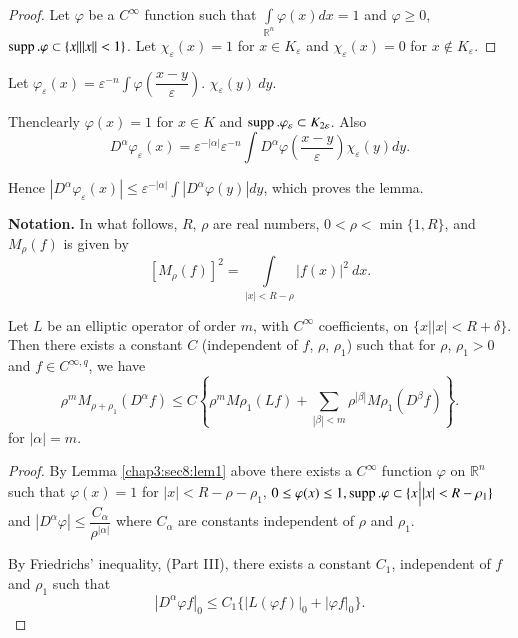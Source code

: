 \begin{proof}
  Let $\varphi$ be a $C^\infty$ function such that
  $\int\limits_{\mathbb{R}^n} \varphi (x) dx = 1$ and $\varphi \geq
  0$, $\operatorname{supp}. \varphi \subset \{x | || x || < 1 \}$. Let $\chi_
  \varepsilon (x) = 1$ for $x \in K_\varepsilon$ and $\chi_
  \varepsilon (x) = 0$ for $x \notin K_\varepsilon$. 
\end{proof}

Let $\varphi_ \varepsilon (x) = \varepsilon^{-n} \int \varphi
\left(\dfrac{x-y}{\varepsilon}\right)$. $\chi_ \varepsilon (y) ~ dy$. 

Then\pageoriginale clearly $\varphi (x)  = 1$ for $x \in K$ and $\operatorname{supp}. \varphi_
\varepsilon \subset K_{2 \varepsilon}$. Also 
$$
D^ \alpha \varphi_ \varepsilon (x) = \varepsilon^{- | \alpha|}
\varepsilon^{-n} \int D^ \alpha \varphi \left(\frac{x-y} {\varepsilon}\right)
\chi_ \varepsilon (y) dy. 
$$

Hence $| D^ \alpha \varphi_\varepsilon (x) | \leq \varepsilon^{-|
  \alpha |} \int | D^ \alpha \varphi (y) | dy$, which proves the
lemma. 

\noindent
\textbf{Notation.} In what follows, $R$, $\rho$ are real numbers, $0 <
\rho < \min \{1, R\}$, and $M_ \rho (f)$ is given by  
$$
[M_ \rho (f)]^2 = \int\limits_{|x| < R - \rho} | f(x) |^2  ~ dx.
$$

\setcounter{proposition}{0}
\begin{proposition}\label{chap3:sec8:prop1}%
  Let $L$ be an elliptic operator of order $m$, with $C^ \infty$
  coefficients, on $\{x \Big| |x| < R + \delta \}$. Then there exists a
  constant $C$ (independent of $f$, $\rho$, $\rho_1$) such that for
  $\rho$, $\rho_1 > 0$ and $f \in C^{\infty, q}$, we have 
  $$
  \rho^m M_{\rho + \rho_1} (D^\alpha f) \leq C \left\{ \rho^m M \rho_1
  (Lf) + \sum_{|\beta| < m} \rho^{|\beta|} M \rho_1 (D^{\beta}
  f)\right \}. 
  $$
  for $|\alpha| = m$.
\end{proposition}

\begin{proof}
  By Lemma \ref{chap3:sec8:lem1} above there exists a $C^ \infty$ function $\varphi$ on
  $\mathbb{R}^n$ such that $\varphi(x)  = 1$ for $| x | < R - \rho -
  \rho_1$, $0 \leq \varphi (x) \leq 1, \operatorname{supp}. \varphi \subset \{ x
  \Big| |x| < R - \rho_1 \}$ and $| D^ \alpha \varphi| \leq
  \dfrac{C_\alpha}{\rho^{|\alpha|}}$ where $C_\alpha$ are constants
  independent of $\rho$ and $\rho_1$. 
  
  By Friedrichs' inequality, (Part III), there exists a constant
  $C_1$, independent of $f$ and $\rho_1$ such that 
  $$
  |D^ \alpha \varphi f |_0 \leq C_1 \{ | L (\varphi f)|_0 + | \varphi f|_0 \}.
  $$
\end{proof}

